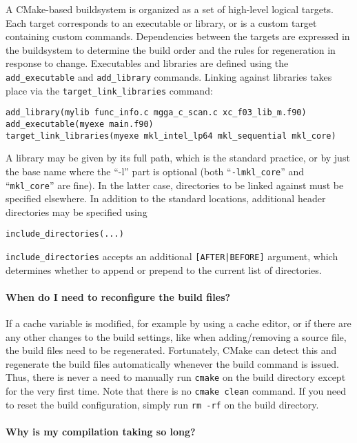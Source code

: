 A CMake-based buildsystem is organized as a set of high-level logical targets. Each target corresponds to an executable or library, or is a custom target containing custom commands. Dependencies between the targets are expressed in the buildsystem to determine the build order and the rules for regeneration in response to change. Executables and libraries are defined using the \verb+add_executable+ and \verb+add_library+ commands. Linking against libraries takes place via the \verb+target_link_libraries+ command:
\begin{verbatim}
add_library(mylib func_info.c mgga_c_scan.c xc_f03_lib_m.f90)
add_executable(myexe main.f90)
target_link_libraries(myexe mkl_intel_lp64 mkl_sequential mkl_core)
\end{verbatim}
A library may be given by its full path, which is the standard practice, or by just the base name where the ``-l'' part is optional (both ``\texttt{-lmkl\_core}'' and ``\texttt{mkl\_core}'' are fine). In the latter case, directories to be linked against must be specified elsewhere. In addition to the standard locations, additional header directories may be specified using
\begin{verbatim}
include_directories(...)
\end{verbatim}
\texttt{include\_directories} accepts an additional \texttt{[AFTER|BEFORE]} argument, which determines whether to append or prepend to the current list of directories.

\paragraph{When do I need to reconfigure the build files?}

If a cache variable is modified, for example by using a cache editor, or if there are any other changes to the build settings, like when adding/removing a source file, the build files need to be regenerated. Fortunately, CMake can detect this and regenerate the build files automatically whenever the build command is issued. Thus, there is never a need to manually run \texttt{cmake} on the build directory except for the very first time. Note that there is no \texttt{cmake clean} command. If you need to reset the build configuration, simply run \texttt{rm -rf} on the build directory.

\paragraph{Why is my compilation taking so long?}

